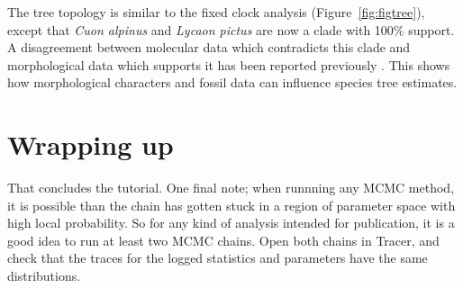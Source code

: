 \documentclass[12pt]{article}
\begin{document}
The tree topology is similar to the fixed clock analysis
(Figure~\ref{fig:figtree}), except that \textit{Cuon alpinus} and
\textit{Lycaon pictus} are now a clade with 100\% support. A disagreement
between molecular data which contradicts this clade and morphological
data which supports it has been reported previously \parencite{Zrzavy2004}. This shows
how morphological characters and fossil data can influence species tree
estimates.

\clearpage

\section{Wrapping up}

That concludes the tutorial. One final note; when runnning any MCMC method, it
is possible than the chain has gotten stuck in a region of parameter space
with high local probability. So for any kind of analysis intended for
publication, it is a good idea to run at least two MCMC chains. Open both
chains in Tracer, and check that the traces for the logged statistics and
parameters have the same distributions.

\printbibliography
\end{document}
